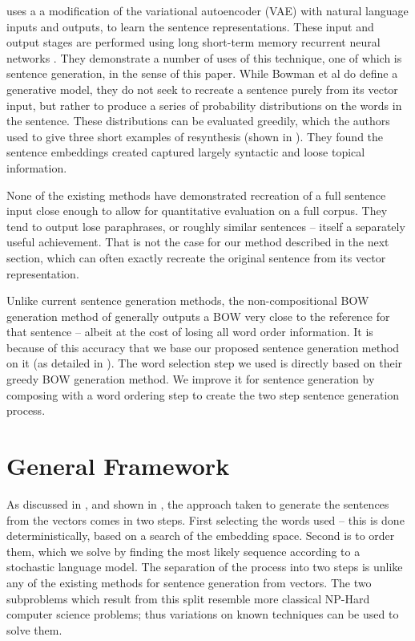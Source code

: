 \documentclass[11pt]{article}
\theoremstyle{plain}
\theoremstyle{definition}
\newcommand{\parencite}{\protect\cite}
\newcommand{\textcite}{\protect\newcite}
\begin{document}

\textcite{Bowman2015SmoothGeneration} uses a a modification of the variational autoencoder (VAE) \parencite{kingma2013auto} with natural language inputs and outputs, to learn the sentence representations. These input and output stages are performed using long short-term memory recurrent neural networks \parencite{hochreiter1997long}. They demonstrate a number of uses of this technique, one of which is sentence generation, in the sense of this paper.
While Bowman et al do define a generative model, they do not seek to recreate a sentence purely from its vector input, but rather to produce a series of probability distributions on the words in the sentence. These distributions can be evaluated greedily, which the authors used to give three short examples of resynthesis (shown in ). They found the sentence embeddings created captured largely syntactic and loose topical information. 

None of the existing methods have demonstrated recreation of a full sentence input close enough to allow for quantitative evaluation on a full corpus. They tend to output lose paraphrases, or roughly similar sentences -- itself a separately useful achievement.  That is not the case for our method described in the next section, which can often exactly recreate the original sentence from its vector representation.

Unlike current sentence generation methods, the non-compositional BOW generation method of \textcite{White2015BOWgen} generally outputs a BOW very close to the reference for that sentence -- albeit at the cost of losing all word order information. It is because of this accuracy that we base our proposed sentence generation method on it (as detailed in ). The word selection step we used is directly based on their greedy BOW generation method. We improve it for sentence generation by composing with a word ordering step to create the two step sentence generation process.


\section{General Framework}\label{framework}
As discussed in , and shown in , the approach taken to generate the sentences from the vectors comes in two steps. First selecting the words used -- this is done deterministically, based on a search of the embedding space. Second is to order them, which we solve by finding the most likely sequence according to a stochastic language model. The separation of the process into two steps is unlike any of the existing methods for sentence generation from vectors. The two subproblems which result from this split resemble more classical NP-Hard computer science problems; thus variations on known techniques can be used to solve them.
\end{document}
